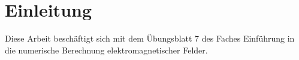 \chapter{Einleitung}\label{sec:intro}
Diese Arbeit beschäftigt sich mit dem Übungsblatt 7 des Faches \glqq Einführung in die numerische Berechnung elektromagnetischer Felder\grqq{}.